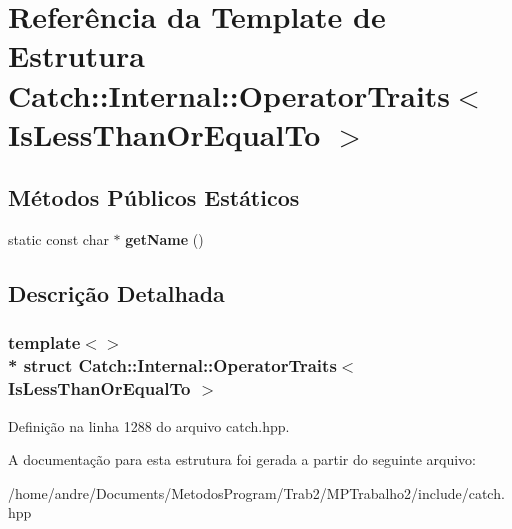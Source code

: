 \hypertarget{structCatch_1_1Internal_1_1OperatorTraits_3_01IsLessThanOrEqualTo_01_4}{}\section{Referência da Template de Estrutura Catch\+:\+:Internal\+:\+:Operator\+Traits$<$ Is\+Less\+Than\+Or\+Equal\+To $>$}
\label{structCatch_1_1Internal_1_1OperatorTraits_3_01IsLessThanOrEqualTo_01_4}
\subsection*{Métodos Públicos Estáticos}
\begin{DoxyCompactItemize}
\item 
static const char $\ast$ {\bfseries get\+Name} ()\hypertarget{structCatch_1_1Internal_1_1OperatorTraits_3_01IsLessThanOrEqualTo_01_4_ae8578813bc847838f10448c1541a9d7b}{}\label{structCatch_1_1Internal_1_1OperatorTraits_3_01IsLessThanOrEqualTo_01_4_ae8578813bc847838f10448c1541a9d7b}

\end{DoxyCompactItemize}


\subsection{Descrição Detalhada}
\subsubsection*{template$<$$>$\\*
struct Catch\+::\+Internal\+::\+Operator\+Traits$<$ Is\+Less\+Than\+Or\+Equal\+To $>$}



Definição na linha 1288 do arquivo catch.\+hpp.



A documentação para esta estrutura foi gerada a partir do seguinte arquivo\+:\begin{DoxyCompactItemize}
\item 
/home/andre/\+Documents/\+Metodos\+Program/\+Trab2/\+M\+P\+Trabalho2/include/catch.\+hpp\end{DoxyCompactItemize}
